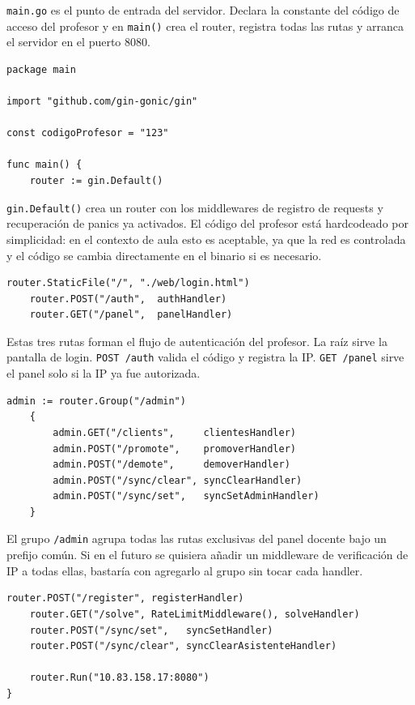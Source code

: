 \documentclass[12pt, a4paper]{article}
\begin{document}
\texttt{main.go} es el punto de entrada del servidor. Declara la constante del código
de acceso del profesor y en \texttt{main()} crea el router, registra todas las rutas y
arranca el servidor en el puerto 8080.

\begin{lstlisting}[style=golang, caption={\texttt{main.go} completo}]
package main

import "github.com/gin-gonic/gin"

const codigoProfesor = "123"

func main() {
    router := gin.Default()
\end{lstlisting}

\texttt{gin.Default()} crea un router con los middlewares de registro de requests y
recuperación de panics ya activados. El código del profesor está hardcodeado por
simplicidad: en el contexto de aula esto es aceptable, ya que la red es controlada y
el código se cambia directamente en el binario si es necesario.

\begin{lstlisting}[style=golang]
    router.StaticFile("/", "./web/login.html")
    router.POST("/auth",  authHandler)
    router.GET("/panel",  panelHandler)
\end{lstlisting}

Estas tres rutas forman el flujo de autenticación del profesor. La raíz sirve la
pantalla de login. \texttt{POST /auth} valida el código y registra la IP. \texttt{GET
/panel} sirve el panel solo si la IP ya fue autorizada.

\begin{lstlisting}[style=golang]
    admin := router.Group("/admin")
    {
        admin.GET("/clients",     clientesHandler)
        admin.POST("/promote",    promoverHandler)
        admin.POST("/demote",     demoverHandler)
        admin.POST("/sync/clear", syncClearHandler)
        admin.POST("/sync/set",   syncSetAdminHandler)
    }
\end{lstlisting}

El grupo \texttt{/admin} agrupa todas las rutas exclusivas del panel docente bajo un
prefijo común. Si en el futuro se quisiera añadir un middleware de verificación de IP
a todas ellas, bastaría con agregarlo al grupo sin tocar cada handler.

\begin{lstlisting}[style=golang]
    router.POST("/register", registerHandler)
    router.GET("/solve", RateLimitMiddleware(), solveHandler)
    router.POST("/sync/set",   syncSetHandler)
    router.POST("/sync/clear", syncClearAsistenteHandler)

    router.Run("10.83.158.17:8080")
}
\end{lstlisting}
\end{document}
